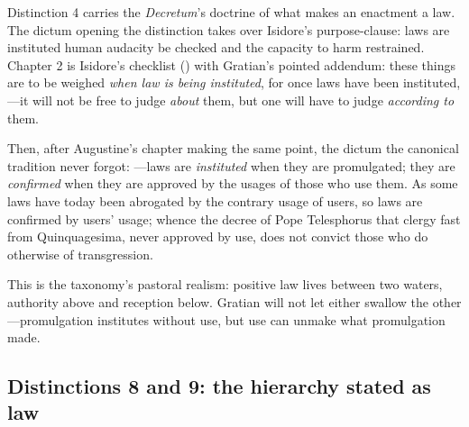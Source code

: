 Distinction 4 carries the \emph{Decretum}'s doctrine of what makes an enactment a law. The dictum opening the distinction takes over Isidore's purpose-clause: laws are instituted  human audacity be checked and the capacity to harm restrained. Chapter 2 is Isidore's checklist () with Gratian's pointed addendum: these things are to be weighed \emph{when law is being instituted}, for once laws have been instituted, ---it will not be free to judge \emph{about} them, but one will have to judge \emph{according to} them.

Then, after Augustine's chapter making the same point, the dictum the canonical tradition never forgot: ---laws are \emph{instituted} when they are promulgated; they are \emph{confirmed} when they are approved by the usages of those who use them. As some laws have today been abrogated by the contrary usage of users, so laws are confirmed by users' usage; whence the decree of Pope Telesphorus that clergy fast from Quinquagesima, never approved by use, does not convict those who do otherwise of transgression.

This is the taxonomy's pastoral realism: positive law lives between two waters, authority above and reception below. Gratian will not let either swallow the other---promulgation institutes without use, but use can unmake what promulgation made.

\subsection{Distinctions 8 and 9: the hierarchy stated as law}

